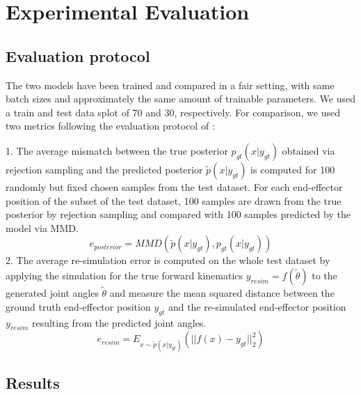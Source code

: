 \documentclass[conference]{IEEEtran}
\begin{document}
\section*{Experimental Evaluation}
\subsection*{Evaluation protocol}
The two models have been trained and compared in a fair setting, with same batch sizes and approximately the same amount of trainable parameters. We used a train and test data splot of 70 and 30, respectively. For comparison, we used two metrics following the evaluation protocol of \cite{Kruse2019}:

1. The average mismatch between the true posterior $p_{gt}(x | y_{gt})$ obtained via rejection sampling and the predicted posterior $\tilde p(x | y_{gt})$ is computed for 100 randomly but fixed chosen samples from the test dataset. For each end-effector position of the subset of the test dataset, 100 samples are drawn from the true posterior by rejection sampling and compared with 100 samples predicted by the model via MMD.
\begin{equation}
e_{posterior} = MMD(\tilde p(x | y_{gt}), p_{gt}(x | y_{gt}))
\end{equation}
2. The average re-simulation error is computed on the whole test dataset by applying the simulation for the true forward kinematics $y_{resim} = f( \tilde \theta)$ to the generated joint angles $\tilde \theta$ and measure the mean squared distance between the ground truth end-effector position $y_{gt}$ and the re-simulated end-effector position $y_{resim}$ resulting from the predicted joint angles.
\begin{equation}
e_{resim} = E_{x \sim \tilde{p}(x|y_{gt})}(|| f(x) - y_{gt}||^2_2)
\end{equation}

\subsection*{Results}
\end{document}
